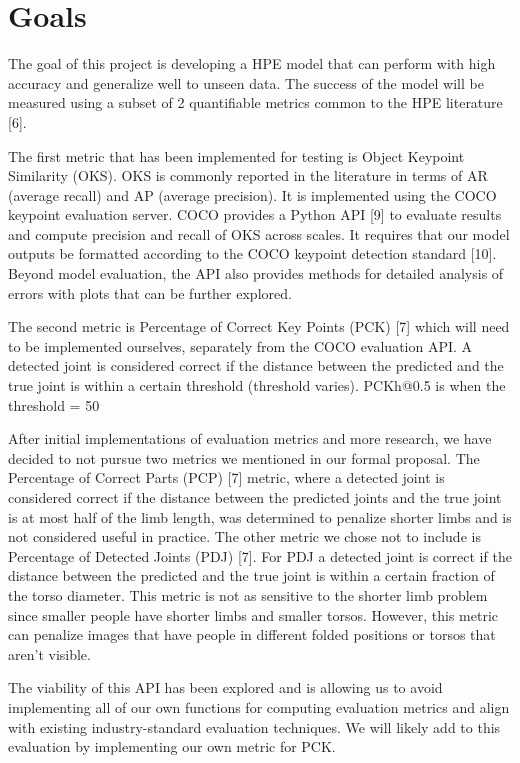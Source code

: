 \documentclass[11pt, letterpaper]{article}
\begin{document}
\section{Goals}

The goal of this project is developing a HPE model that can perform with high accuracy and generalize well to unseen data. The success of the model will be measured using a subset of 2 quantifiable metrics common to the HPE literature [6]. 

The first metric that has been implemented for testing is Object Keypoint Similarity (OKS). OKS is commonly reported in the literature in terms of AR (average recall) and AP (average precision). It is implemented using the COCO keypoint evaluation server. COCO provides a Python API [9] to evaluate results and compute precision and recall of OKS across scales. It requires that our model outputs be formatted according to the COCO keypoint detection standard [10]. Beyond model evaluation, the API also provides methods for detailed analysis of errors with plots that can be further explored.

The second metric is Percentage of Correct Key Points (PCK) [7] which will need to be implemented ourselves, separately from the COCO evaluation API. A detected joint is considered correct if the distance between the predicted and the true joint is within a certain threshold (threshold varies). PCKh@0.5 is when the threshold = 50%

After initial implementations of evaluation metrics and more research, we have decided to not pursue two metrics we mentioned in our formal proposal. The Percentage of Correct Parts (PCP) [7] metric, where a detected joint is considered correct if the distance between the predicted joints and the true joint is at most half of the limb length, was determined to penalize shorter limbs and is not considered useful in practice. The other metric we chose not to include is Percentage of Detected Joints (PDJ) [7]. For PDJ a detected joint is correct if the distance between the predicted and the true joint is within a certain fraction of the torso diameter. This metric is not as sensitive to the shorter limb problem since smaller people have shorter limbs and smaller torsos. However, this metric can penalize images that have people in different folded positions or torsos that aren’t visible.

The viability of this API has been explored and is allowing us to avoid implementing all of our own functions for computing evaluation metrics and align with existing industry-standard evaluation techniques. We will likely add to this evaluation by implementing our own metric for PCK.
\end{document}
